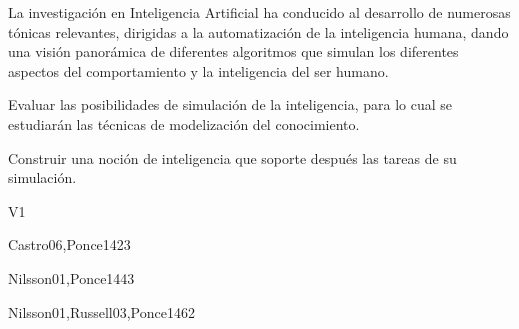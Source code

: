 \begin{syllabus}


\begin{justification}
    La investigación en Inteligencia Artificial ha conducido al desarrollo de
    numerosas tónicas relevantes, dirigidas a la automatización de la
    inteligencia humana, dando una visión panorámica de diferentes
    algoritmos que simulan los diferentes aspectos del comportamiento
    y la inteligencia del ser humano.
    \end{justification}
    
    \begin{goals}
    \item Evaluar las posibilidades de simulación de la inteligencia, para lo cual se estudiarán las técnicas de modelización del conocimiento.
    \item Construir una noción de inteligencia que soporte después las tareas de su simulación.
    \end{goals}
    
    \begin{outcomes}{V1}
        \item {}
        \item {}
        \item {}
        \item {}
    \end{outcomes}
    
    \begin{unit}{\ISFundamentalIssues}{}{Castro06,Ponce14}{2}{3}
        \ISFundamentalIssuesAllTopics
        \ISFundamentalIssuesAllLearningOutcomes
    \end{unit}
    
    \begin{unit}{\ISBasicSearchStrategies}{}{Nilsson01,Ponce14}{4}{3}
        \ISBasicSearchStrategiesAllTopics
        \ISBasicSearchStrategiesAllLearningOutcomes
    \end{unit}
    
    \begin{unit}{\ISBasicKnowledgeRepresentationandReasoning}{}{Nilsson01,Russell03,Ponce14}{6}{2}
        \ISBasicKnowledgeRepresentationandReasoningAllTopics
        \ISBasicKnowledgeRepresentationandReasoningAllLearningOutcomes
    \end{unit}
    

\end{syllabus}
